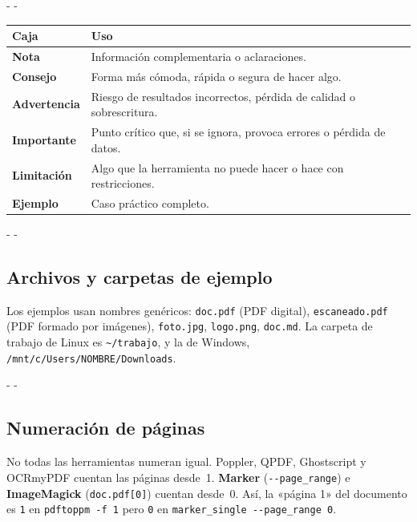 \documentclass[11pt,a4paper]{article}
\makeatletter
\newcommand{\necesitaespacio}[1]{\par\penalty-100\begingroup
	\setlength{\dimen@}{#1}\dimen@ii\pagegoal\advance\dimen@ii-\pagetotal
	\ifdim\dimen@>\dimen@ii\ifdim\dimen@ii>\z@\vfil\fi\penalty-\@M\fi\endgroup}
\newcommand{\cmd}[1]{\texttt{\textcolor{colcmd}{#1}}}      %
\newcommand{\opt}[1]{\texttt{\textcolor{colopt}{#1}}}      %
\newcommand{\arch}[1]{\texttt{\textcolor{colarch}{#1}}}    %
\newcommand{\val}[1]{\texttt{#1}}                          %
\newcommand{\cab}[1]{\textbf{#1}}
\newcommand{\tl}{\textasciitilde{}}  %
\makeatother
\begin{document}
	\begingroup\small
	\necesitaespacio{18\baselineskip}
	\begin{longtable}{L{3.2cm}L{11.86cm}}
		\toprule{}\cab{Caja} & \cab{Uso}\\\midrule
		\endfirsthead
		\bottomrule
		\endfoot
		\textbf{\textcolor{colnota}{Nota}} & Información complementaria o aclaraciones.\\*
		\textbf{\textcolor{colconsejo}{Consejo}} & Forma más cómoda, rápida o segura de hacer algo.\\
		\textbf{\textcolor{coladvert}{Advertencia}} & Riesgo de resultados incorrectos, pérdida de calidad o sobrescritura.\\
		\textbf{\textcolor{colimport}{Importante}} & Punto crítico que, si se ignora, provoca errores o pérdida de datos.\\
		\textbf{\textcolor{collimit}{Limitación}} & Algo que la herramienta no puede hacer o hace con restricciones.\\*
		\textbf{\textcolor{colejemplo}{Ejemplo}} & Caso práctico completo.\\
	\end{longtable}
	\endgroup
	
	\necesitaespacio{12\baselineskip}
	\subsection{Archivos y carpetas de ejemplo}
	
	Los ejemplos usan nombres genéricos: \arch{doc.pdf} (PDF digital), \arch{escaneado.pdf} (PDF formado por imágenes), \arch{foto.jpg}, \arch{logo.png}, \arch{doc.md}. La carpeta de trabajo de Linux es \arch{\tl/trabajo}, y la de Windows, \arch{/\allowbreak{}mnt/\allowbreak{}c/\allowbreak{}Users/\allowbreak{}NOMBRE/\allowbreak{}Downloads}.
	
	\necesitaespacio{8\baselineskip}
	\subsection{Numeración de páginas}
	
	\begin{importante}
		No todas las herramientas numeran igual. Poppler, QPDF, Ghostscript y OCRmyPDF cuentan las páginas desde~1. \textbf{Marker} (\opt{-{}-page\_range}) e \textbf{ImageMagick} (\arch{doc.pdf[0]}) cuentan desde~0. Así, la «página 1» del documento es \val{1} en \cmd{pdftoppm -f 1} pero \val{0} en \cmd{marker\_\allowbreak{}single -{}-page\_\allowbreak{}range 0}.
	\end{importante}
	
\end{document}
